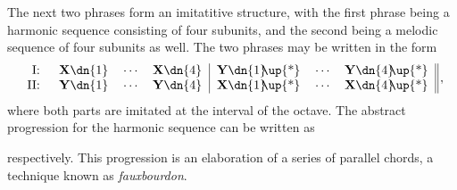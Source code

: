 \begin{example}[\bwv{935}]
The next two phrases form an imitatitive structure, with the first phrase being a harmonic sequence consisting of four subunits, and the second being a melodic sequence of four subunits as well. The two phrases may be written in the form
\begin{equation*}
\begin{tabular}{rccc|ccc||}
I: \quad & \textbf{X}\dn{1} &  $\cdots$\! & \textbf{X}\dn{4} & \textbf{Y}\dn{1}\!\!\up{*} &  $\cdots$\! & \textbf{Y}\dn{4}\!\!\up{*} \\
II: \quad & \textbf{Y}\dn{1} &  $\cdots$\! & \textbf{Y}\dn{4} & \textbf{X}\dn{1}\!\!\up{*} &  $\cdots$\! & \textbf{X}\dn{4}\!\!\up{*}\\
\end{tabular} \, ,
\end{equation*}
where both parts are imitated at the interval of the octave. The abstract progression for the harmonic sequence can be written as
\begin{center}
   \raisebox{20.5pt}{.}
\end{center}
respectively. This progression is an elaboration of a series of parallel  chords, a technique known as \textit{fauxbourdon}.


\end{example}
